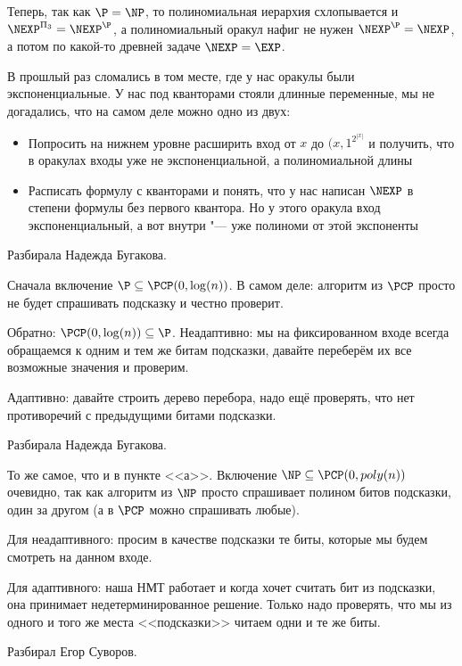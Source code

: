 	Теперь, так как $\P=\NP$, то полиномиальная иерархия схлопывается и $\NEXP^{\Pi_3}=\NEXP^{\P}$,
	а полиномиальный оракул нафиг не нужен $\NEXP^\P=\NEXP$, а потом по какой-то древней задаче $\NEXP=\EXP$.

	\begin{Rem}
		В прошлый раз сломались в том месте, где у нас оракулы были экспоненциальные.
		У нас под кванторами стояли длинные переменные, мы не догадались, что на самом деле можно одно из двух:
		\begin{itemize}
			\item Попросить на нижнем уровне расширить вход от $x$ до $(x, 1^{2^{|x|}}$ и получить, что в оракулах входы уже не экспоненциальной, а полиномиальной длины
			\item
				Расписать формулу с кванторами и понять, что у нас написан $\NEXP$ в степени формулы без первого квантора.
				Но у этого оракула вход экспоненциальный, а вот внутри "--- уже полиноми от этой экспоненты
		\end{itemize}
	\end{Rem}

	Разбирала Надежда Бугакова.

	Сначала включение $\P\subseteq \PCP(0, \log(n))$.
	В самом деле: алгоритм из $\PCP$ просто не будет спрашивать подсказку и честно проверит.

	Обратно: $\PCP(0, \log(n)) \subseteq \P$.
	Неадаптивно: мы на фиксированном входе всегда обращаемся к одним и тем же битам подсказки, давайте
	переберём их все возможные значения и проверим.

	Адаптивно: давайте строить дерево перебора, надо ещё проверять, что нет противоречий с предыдущими битами подсказки.

	Разбирала Надежда Бугакова.

	То же самое, что и в пункте <<а>>.
	Включение $\NP\subseteq \PCP(0, poly(n))$ очевидно, так как алгоритм из $\NP$ просто спрашивает
	полином битов подсказки, один за другом (а в $\PCP$ можно спрашивать любые).

	Для неадаптивного: просим в качестве подсказки те биты, которые мы будем смотреть на данном входе.

	Для адаптивного: наша НМТ работает и когда хочет считать бит из подсказки, она принимает недетерминированное решение.
	Только надо проверять, что мы из одного и того же места <<подсказки>> читаем одни и те же биты.

	Разбирал Егор Суворов.
	\TODO

